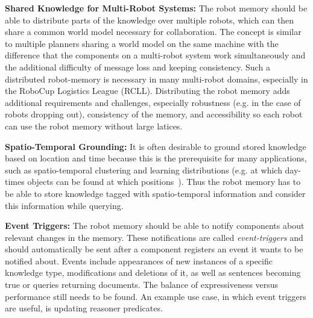 \documentclass[a4paper,11pt]{article}
\begin{document}
\smallskip
\textbf{Shared Knowledge for Multi-Robot Systems:} The robot memory
should be able to distribute parts of the knowledge over multiple
robots, which can then share a common world model necessary for
collaboration. The concept is similar to multiple planners sharing a
world model on the same machine with the difference that the
components on a multi-robot system work simultaneously and the
additional difficulty of message loss and keeping consistency. Such a
distributed robot-memory is necessary in many multi-robot domains,
especially in the RoboCup Logistics League (RCLL).
Distributing the robot memory adds
additional requirements and challenges, especially robustness (e.g. in
the case of robots dropping out), consistency of the memory, and
accessibility so each robot can use the robot memory without large
latices.

\smallskip
\textbf{Spatio-Temporal Grounding:} It is often desirable to ground
stored knowledge based on location and time because this is the
prerequisite for many applications, such as spatio-temporal clustering
and learning distributions (e.g. at which day-times objects can be
found at which positions~\cite{deebul}). Thus the robot
memory has to be able to store knowledge tagged with spatio-temporal
information and consider this information while querying.

\smallskip
\textbf{Event Triggers:} The robot memory should be able to notify
components about relevant changes in the memory.  These notifications
are called \emph{event-triggers} and should automatically be sent
after a component registers an event it wants to be notified
about. Events include appearances of new instances of a specific
knowledge type, modifications and deletions of it, as well as
sentences becoming true or queries returning documents. The balance of
expressiveness versus performance still needs to be found. An example
use case, in which event triggers are useful, is updating reasoner
predicates.

\end{document}

